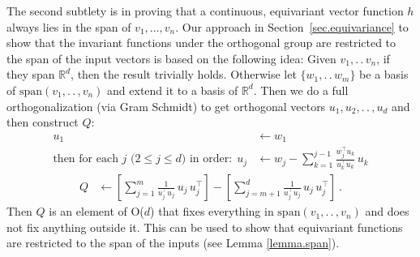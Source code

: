 \documentclass{article}
\theoremstyle{Hogg}
\renewcommand{\ldots}{.\,.\,}
\renewcommand{\cdots}{\ldots}
\begin{document}
The second subtlety is in proving that a continuous, equivariant vector function $h$ always lies in the span of $v_1,\dots,v_n$. Our approach in Section~\ref{sec.equivariance} to show that the invariant functions under the orthogonal group are restricted to the span of the input vectors is based on the following idea: Given $v_1,\ldots v_n$, if they span $\mathbb R^d$, then the result trivially holds. Otherwise let $\{w_1,\ldots w_m\}$ be a basis of  $\text{span}(v_1,\ldots,v_n)$ and  extend it to a basis of $\mathbb R^{d}$. 
Then we do a full orthogonalization (via Gram Schmidt) to get orthogonal vectors $u_1,u_2,\cdots,u_d$ and then construct $Q$:
\begin{align}
    u_1 &\leftarrow w_1
    \\
    \mbox{then for each $j$ ($2\leq j\leq d$) in order:} ~~ u_j &\leftarrow w_j - \sum_{k=1}^{j-1} \frac{w_j^\top u_k}{u_k^\top u_k}\,u_k
\end{align}\vspace{-1\baselineskip}\begin{align}
    Q &\leftarrow \left[\sum_{j=1}^{m} \frac{1}{u_j^\top u_j}\,u_j\,u_j^\top\right] - \left[\sum_{j=m+1}^{d} \frac{1}{u_j^\top u_j}\,u_j\,u_j^\top
    \right]
    ~.
\end{align}
Then $Q$ is an element of O($d$) that fixes everything in $\text{span}(v_1,\ldots, v_n)$ and does not fix anything outside it. This can be used to show that equivariant functions are restricted to the span of the inputs (see Lemma \ref{lemma.span}).
\end{document}
